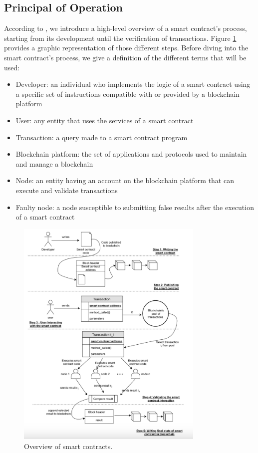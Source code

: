 \subsection{Principal of Operation}
According to \cite{kemmoe_recent_2020}, we introduce a high-level overview of a smart
contract’s process, starting from its development until the
verification of transactions. Figure \ref{fig:Overview of smart contracts} provides a graphic representation of those different steps.
Before diving into the smart contract’s process, we give a
definition of the different terms that will be used:
\begin{itemize}
    \item  Developer: an individual who implements the logic of a
smart contract using a specific set of instructions compatible with or provided by a blockchain platform
    \item  User: any entity that uses the services of a smart contract
    \item Transaction: a query made to a smart contract program
    \item Blockchain platform: the set of applications and protocols used to maintain and manage a blockchain
    \item Node: an entity having an account on the blockchain
platform that can execute and validate transactions
    \item  Faulty node: a node susceptible to submitting false
results after the execution of a smart contract
\end{itemize}
 \begin{figure}[ht]
 \centering
  \includegraphics[height = 0.9 \textwidth,width=0.8\textwidth]{overview of smart contract.png}
  \caption{Overview of smart contracts.}
  \label{fig:Overview of smart contracts}
\end{figure}

